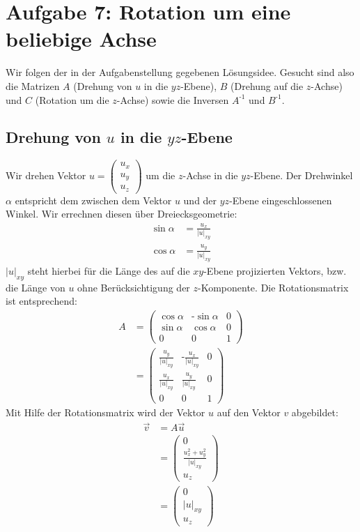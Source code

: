 \documentclass[a4paper]{scrartcl}
\begin{document}
\section*{Aufgabe 7: Rotation um eine beliebige Achse}
Wir folgen der in der Aufgabenstellung gegebenen Lösungsidee. Gesucht sind also die Matrizen $A$ (Drehung von $u$ in die $yz$-Ebene), $B$ (Drehung auf die $z$-Achse) und $C$ (Rotation um die $z$-Achse) sowie die Inversen $A^{\text{-}1}$ und $B^{\text{-}1}$.

\subsection*{Drehung von $u$ in die $yz$-Ebene}
Wir drehen Vektor $u=\begin{pmatrix} u_x \\ u_y \\ u_z \end{pmatrix}$ um die $z$-Achse in die $yz$-Ebene. Der Drehwinkel $\alpha$ entspricht dem zwischen dem Vektor $u$ und der $yz$-Ebene eingeschlossenen Winkel. Wir errechnen diesen über Dreiecksgeometrie:
\begin{align*}
\sin\alpha & = \frac{u_x}{\left|u\right|_{xy}} \\
\cos\alpha & = \frac{u_y}{\left|u\right|_{xy}}
\end{align*}
$\left|u\right|_{xy}$ steht hierbei für die Länge des auf die $xy$-Ebene projizierten Vektors, bzw. die Länge von $u$ ohne Berücksichtigung der $z$-Komponente. Die Rotationsmatrix ist entsprechend:
\begin{align*}
A & = \begin{pmatrix} \cos\alpha & \text{-}\sin\alpha & 0 \\ \sin\alpha & \cos\alpha & 0 \\ 0 & 0 & 1 \end{pmatrix}
\\
& = \begin{pmatrix} 
\frac{u_y}{\left|u\right|_{xy}} & \text{-} \frac{u_x}{\left|u\right|_{xy}} & 0 \\ 
\frac{u_x}{\left|u\right|_{xy}} & \frac{u_y}{\left|u\right|_{xy}} & 0 \\ 
0 & 0 & 1
\end{pmatrix}
\end{align*}
Mit Hilfe der Rotationsmatrix wird der Vektor $u$ auf den Vektor $v$ abgebildet:
\begin{align*}
\vec{v} & = A\vec{u} \\
& = \begin{pmatrix} 0 \\ \frac{u_x^2 + u_y^2}{\left|u\right|_{xy}} \\ u_z\end{pmatrix} \\
& = \begin{pmatrix} 0 \\ \left|u\right|_{xy} \\ u_z\end{pmatrix}
\end{align*}
\end{document}
